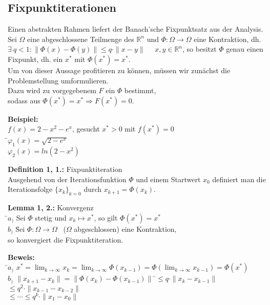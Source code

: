 \documentclass[10pt,a4paper]{article}
\begin{document}
\subsection{Fixpunktiterationen}
Einen abstrakten Rahmen liefert der Banach'sche Fixpunktsatz aus der Analysis.
\\Sei $\Omega$ eine abgeschlossene Teilmenge des $\mathbb{R}^n$ und $\Phi: \Omega \longrightarrow \Omega$ eine Kontraktion, dh. $\exists \ q<1: \| \Phi(x) - \Phi(y)\| \leq q\cdot \|x-y\|$ \ \ $x,y \in \mathbb{R}^n$, so besitzt $\Phi$ genau einen Fixpunkt, dh. ein $x^*$ mit $\Phi(x^*)=x^*$.
\\Um von dieser Aussage profitieren zu können, müssen wir zunächst die Problemstellung umformulieren.
\\Dazu wird zu vorgegebenem $F$ ein $\Phi$ bestimmt, 
\\sodass aus $\Phi(x^*)=x^* \Rightarrow F(x^*)=0$.
\begin{tabbing}
\textbf{Beispiel:}
\\$f(x)=2-x^2-e^x$, gesucht $x^*>0$ mit $f(x^*)=0$\\
\hspace*{8mm} \=$\varphi_1(x)=\sqrt{2-e^x}$\\
\>$\varphi_2(x)=ln(2-x^2)$\\
\end{tabbing}
\textbf{Definition 1, 1.:} Fixpunktiteration
\\Ausgehend von der Iterationsfunktion $\Phi$ und einem Startwert $x_0$ definiert man die Iterationsfolge $\{x_k\}_{k=0}$ durch $x_{k+1}=\Phi(x_k)$.\\
\begin{tabbing}
\textbf{Lemma 1, 2.:} Konvergenz
\\\hspace*{8mm} \=$a_)$ Sei $\Phi$ stetig und $x_k \longmapsto x^*$, so gilt $\Phi(x^*)=x^*$\\
\>$b_)$ \=Sei $\Phi: \Omega \longrightarrow \Omega$ \ ($\Omega$ abgeschlossen) eine Kontraktion,\\
\>\> so konvergiert die Fixpunktiteration.
\end{tabbing}
\begin{tabbing}
\textbf{Beweis:}
\\\hspace*{8mm} \=$a_)$ $x^*=\lim_{k \to \infty}x_k=\lim_{k \to \infty}\Phi(x_{k-1})=\Phi(\lim_{k \to \infty}x_{k-1})=\Phi(x^*)$\\
\>$b_)$ $\|x_{k+1}-x_k\|=\|\Phi(x_k)-\Phi(x_{k-1})\|$ \=$\leq q\cdot \|x_k-x_{k-1}\|$\\
\>\> $\leq q^2\cdot \|x_{k-1}-x_{k-2}\|$\\
\>\> $\leq \cdots\leq q^k\cdot \|x_1-x_0\|$\\
\end{tabbing}
\end{document}
